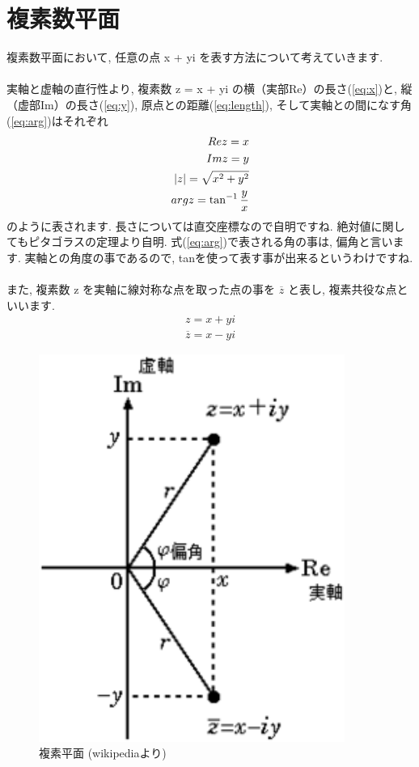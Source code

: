 \documentclass[11pt,a4paper]{jreport}
\begin{document}
\section{複素数平面}
複素数平面において, 任意の点 x + yi を表す方法について考えていきます. \\
\\
実軸と虚軸の直行性より, 複素数 z = x + yi の横（実部Re）の長さ(\ref{eq:x})と, 縦（虚部Im）の長さ(\ref{eq:y}), 原点との距離(\ref{eq:length}), そして実軸との間になす角(\ref{eq:arg})はそれぞれ
\begin{eqnarray}
\mathstrut Re z = x
\label{eq:x}
\\
\mathstrut Im z = y
\label{eq:y}
\\
|z| = \sqrt{x^2 + y^2}
\label{eq:length}\\
\mathstrut arg z = \tan^{-1} \frac{y}{x}
\label{eq:arg}
\end{eqnarray}
のように表されます. 長さについては直交座標なので自明ですね. 絶対値に関してもピタゴラスの定理より自明. 式(\ref{eq:arg})で表される角の事は, 偏角と言います. 実軸との角度の事であるので, tanを使って表す事が出来るというわけですね.\\
\\
また, 複素数 z を実軸に線対称な点を取った点の事を $ \overline{z}$ と表し, 複素共役な点といいます.\\

\begin{eqnarray}
z = x + yi
\end{eqnarray}
\begin{eqnarray}
\overline{z} = x - yi
\end{eqnarray}

\begin{figure}[H]
\label{im:complex}
  \centering
  \includegraphics[width=100mm,bb=0 0 220 279]{figures/Complex.png}
  \caption{複素平面 (wikipediaより)}
\end{figure}
\end{document}
